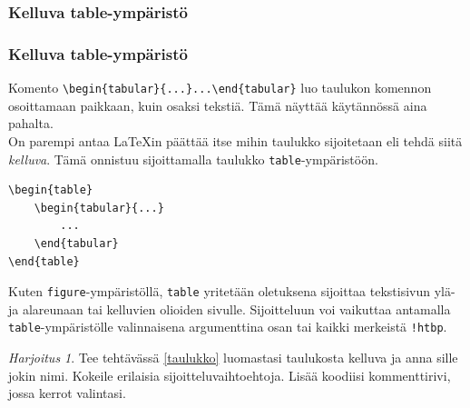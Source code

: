 \documentclass[handout,hyperref={colorlinks=true}]{beamer}
\theoremstyle{remark}
\newtheorem{harj}{Harjoitus}[section]
\newcommand{\vaihto}{\\ \vspace{10pt}}
\begin{document}
\subsubsection{Kelluva table-ympäristö}
\begin{frame}[fragile]
    \frametitle{Kelluva table-ympäristö}
Komento \verb-\begin{tabular}{...}...\end{tabular}- luo taulukon komennon osoittamaan paikkaan, kuin osaksi tekstiä. Tämä näyttää käytännössä aina pahalta. 
    \vaihto
    On parempi antaa \LaTeX in päättää itse mihin taulukko sijoitetaan eli tehdä siitä \emph{kelluva}. Tämä onnistuu sijoittamalla taulukko \verb-table--ympäristöön.
    \begin{table}
        \begin{scriptsize}
            \begin{Verbatim}[frame=single]
\begin{table}
    \begin{tabular}{...}
        ...
    \end{tabular}
\end{table}
            \end{Verbatim}
        \end{scriptsize} 
    \end{table}
    Kuten \verb-figure--ympäristöllä, \verb-table- yritetään oletuksena sijoittaa tekstisivun ylä- ja alareunaan tai kelluvien olioiden sivulle. Sijoitteluun voi vaikuttaa antamalla \verb-table--ympäristölle valinnaisena argumenttina osan tai kaikki merkeistä \verb-!htbp-.
\end{frame}
%
%
\begin{frame}[fragile]
    \begin{harj}\label{kelluvaTaulukko}
        Tee tehtävässä \ref{taulukko} luomastasi taulukosta kelluva ja anna sille jokin nimi. Kokeile erilaisia sijoitteluvaihtoehtoja. Lisää koodiisi kommenttirivi, jossa kerrot valintasi. 
    \end{harj}

\end{frame}
\end{document}
